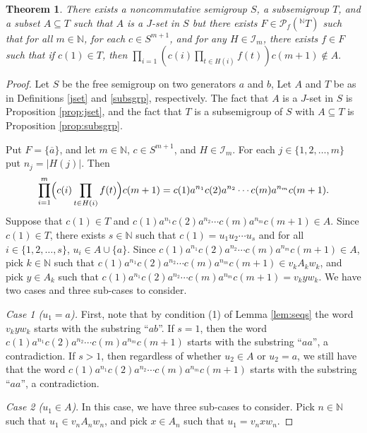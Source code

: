 \documentclass[12pt]{article}
\theoremstyle{plain}
\newtheorem{thm}{Theorem}[section]
\theoremstyle{definition}
\begin{document}
  \begin{thm}
  There exists a noncommutative semigroup $S$, a subsemigroup
  $T$, and a subset $A \subseteq T$ such that $A$ is a $J$-set
  in $S$ but there exists $F \in \mathcal{P}_f(^{\mathbb{N}}{T})$
  such that for all $m \in \mathbb{N}$, for each $c \in S^{m+1}$,
  and for any $H \in \mathcal{I}_m$, there exists $f \in F$ such
  that if $c(1) \in T$, then $\prod_{i=1}(c(i)\prod_{t \in H(i)} f(t))
  c(m+1) \not\in A.$
  \end{thm}
  \begin{proof}
  Let $S$ be the free semigroup on two generators $a$ and $b$,
  Let $A$ and $T$  be as in Definitions \ref{jset} and 
  \ref{subsgrp}, respectively. 
  The fact that $A$ is a $J$-set in $S$ is Proposition 
  \ref{prop:jset}, and the fact that $T$ is a subsemigroup of $S$
  with $A \subseteq T$ is Proposition \ref{prop:subsgrp}.

  Put $F = \{\overline{a}\}$, and let $m \in \mathbb{N}$, $c \in
  S^{m+1}$, and $H \in \mathcal{I}_m$. 
  For each $j \in \{1, 2, \ldots, m\}$ put $n_j = |H(j)|$. 
  Then
  \[
  \prod_{i=1}^m\Bigl(c(i) \prod_{t \in H(i)} f(t)\Bigr)c(m+1) =
  c(1)a^{n_1}c(2)a^{n_2} \cdots c(m)a^{n_m}c(m+1).
  \]
  Suppose that $c(1) \in T$ and $c(1)a^{n_1}c(2)a^{n_2} \cdots 
  c(m)a^{n_m}c(m+1) \in A$. 
  Since $c(1) \in T$, there exists $s \in \mathbb{N}$ such that
  $c(1) = u_1u_2 \cdots u_s$ and for all $i \in \{1, 2, \ldots, s\}$,
  $u_i \in A \cup \{a\}$. 
  Since $c(1)a^{n_1}c(2)a^{n_2} \cdots c(m)a^{n_m}c(m+1) \in A$, pick
  $k \in \mathbb{N}$ such that $c(1)a^{n_1}c(2)a^{n_2} \cdots 
  c(m)a^{n_m}c(m+1) \in v_kA_kw_k$, and pick $y \in A_k$ such that
  $c(1)a^{n_1}c(2)a^{n_2} \cdots c(m)a^{n_m}c(m+1) = v_kyw_k$. 
  We have two cases and three sub-cases to consider. 
  
  \textsl{Case 1 ($u_1=a$).} 
  First, note that by condition (1) of Lemma \ref{lem:seqs} the
  word $v_kyw_k$ starts with the substring ``$ab$''.
  If $s=1$, then the word $c(1)a^{n_1}c(2) \allowbreak a^{n_2} \cdots 
  c(m) a^{n_m} c(m+1)$ starts with the substring ``$aa$'', a
  contradiction.
  If $s>1$, then regardless of whether $u_2 \in A$ or $u_2 = a$,
  we still have that the word $c(1)a^{n_1}c(2) \allowbreak a^{n_2}
  \cdots c(m) a^{n_m} c(m+1)$ starts with the substring ``$aa$'',
  a contradiction.

  \textsl{Case 2 ($u_1 \in A$)}. 
  In this case, we have three sub-cases to consider. 
  Pick $n \in \mathbb{N}$ such that $u_1 \in v_nA_nw_n$, and pick
  $x \in A_n$ such that $u_1 = v_nxw_n$.
  

\end{proof}
\end{document}
